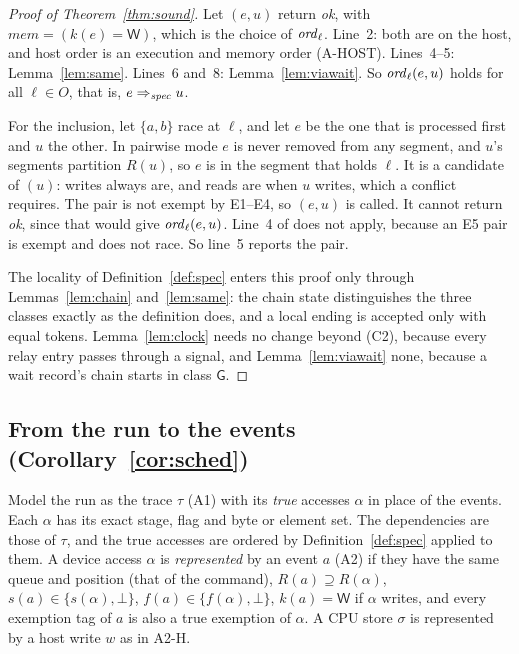 \begin{proof}[Proof of Theorem~\ref{thm:sound}]
Let $(e,u)$ return \emph{ok}, with $\mathit{mem} = (k(e) = \mathsf{W})$, which is the choice of
$\mathit{ord}_{\ell}$. Line~2: both are on the host, and host order is an execution and memory order (A-HOST). Lines~4--5:
Lemma~\ref{lem:same}. Lines~6 and~8: Lemma~\ref{lem:viawait}. So $\mathit{ord}_{\ell}(e,u)$ holds for all $\ell \in O$, that
is, $e \Rightarrow_{\mathit{spec}} u$.

For the inclusion, let $\{a,b\}$ race at $\ell$, and let $e$ be the one that is processed first and $u$ the other. In pairwise
mode $e$ is never removed from any segment, and $u$'s segments partition $R(u)$, so $e$ is in the segment that holds
$\ell$. It is a candidate of $(u)$: writes always are, and reads are when $u$ writes, which a conflict
requires. The pair is not exempt by E1--E4, so $(e,u)$ is called. It cannot return \emph{ok}, since that
would give $\mathit{ord}_{\ell}(e,u)$. Line~4 of  does not apply, because an E5 pair is exempt
and does not race. So line~5 reports the pair.

The locality of Definition~\ref{def:spec} enters this proof only through Lemmas~\ref{lem:chain} and~\ref{lem:same}: the
chain state distinguishes the three classes exactly as the definition does, and a local ending is accepted only with
equal tokens. Lemma~\ref{lem:clock} needs no change beyond (C2), because every relay entry passes through a signal, and
Lemma~\ref{lem:viawait} none, because a wait record's chain starts in class $\mathsf{G}$.
\end{proof}

\subsection{From the run to the events (Corollary~\ref{cor:sched})}
\label{app:abstraction}

Model the run as the trace $\tau$ (A1) with its \emph{true} accesses $\alpha$ in place of the events. Each $\alpha$
has its exact stage, flag and byte or element set. The dependencies are those of $\tau$, and the true accesses are
ordered by Definition~\ref{def:spec} applied to them. A device access $\alpha$ is \emph{represented} by an event $a$ (A2)
if they have the same queue and position (that of the command), $R(a) \supseteq R(\alpha)$, $s(a) \in \{s(\alpha),
\bot\}$, $f(a) \in \{f(\alpha), \bot\}$, $k(a) = \mathsf{W}$ if $\alpha$ writes, and every exemption tag of $a$ is
also a true exemption of $\alpha$. A CPU store $\sigma$ is represented by a host write $w$ as in A2-H.

